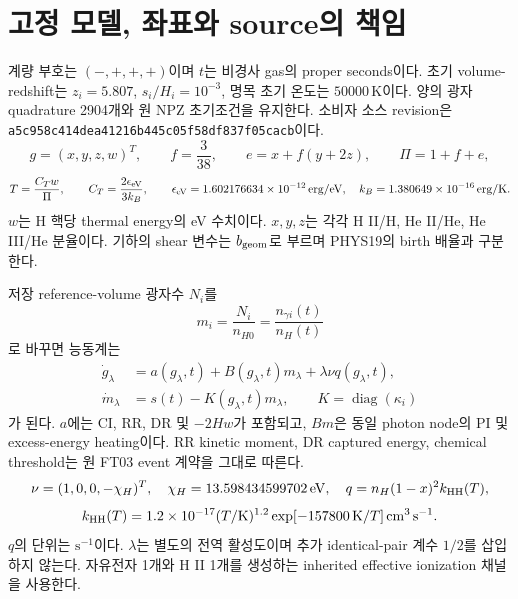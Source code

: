 \documentclass[11pt,a4paper]{article}
\numberwithin{equation}{section}
\begin{document}
\newpage
\section{고정 모델, 좌표와 source의 책임}
계량 부호는 $(-,+,+,+)$이며 $t$는 비경사 gas의 proper seconds이다. 초기 volume-redshift는 $z_i=5.807$, $s_i/H_i=10^{-3}$, 명목 초기 온도는 $50000\,\mathrm K$이다. 양의 광자 quadrature 2904개와 원 NPZ 초기조건을 유지한다. 소비자 소스 revision은 \texttt{a5c958c414dea41216b445c05f58df837f05cacb}이다.
\begin{equation}
 g=(x,y,z,w)^T,\qquad f=\frac3{38},\qquad e=x+f(y+2z),\qquad \Pi=1+f+e,
\end{equation}
\begin{equation}
 T=\frac{C_Tw}{\Pi},\qquad C_T=\frac{2\epsilon_{\mathrm{eV}}}{3k_B},\qquad
 \epsilon_{\mathrm{eV}}=1.602176634\times10^{-12}\,\mathrm{erg/eV},\quad k_B=1.380649\times10^{-16}\,\mathrm{erg/K}.
\end{equation}
$w$는 H 핵당 thermal energy의 eV 수치이다. $x,y,z$는 각각 H II/H, He II/He, He III/He 분율이다. 기하의 shear 변수는 $b_{\rm geom}$로 부르며 PHYS19의 birth 배율과 구분한다.

저장 reference-volume 광자수 $N_i$를
\begin{equation}
 m_i=\frac{N_i}{n_{H0}}=\frac{n_{\gamma i}(t)}{n_H(t)}
\end{equation}
로 바꾸면 능동계는
\begin{align}
 \dot g_\lambda&=a(g_\lambda,t)+B(g_\lambda,t)m_\lambda+\lambda\nu q(g_\lambda,t),\\
 \dot m_\lambda&=s(t)-K(g_\lambda,t)m_\lambda,\qquad K=\operatorname{diag}(\kappa_i)
 \label{eq:system}
\end{align}
가 된다. $a$에는 CI, RR, DR 및 $-2Hw$가 포함되고, $B m$은 동일 photon node의 PI 및 excess-energy heating이다. RR kinetic moment, DR captured energy, chemical threshold는 원 FT03 event 계약을 그대로 따른다.
\begin{equation}
 \nu=(1,0,0,-\chi_H)^T,\quad\chi_H=13.598434599702\,\mathrm{eV},
 \quad q=n_H(1-x)^2k_{\mathrm{HH}}(T),
\end{equation}
\begin{equation}
 k_{\mathrm{HH}}(T)=1.2\times10^{-17}(T/\mathrm K)^{1.2}
 \exp[-157800\,\mathrm K/T]\,\mathrm{cm^3\,s^{-1}}.
\end{equation}
$q$의 단위는 $\mathrm s^{-1}$이다. $\lambda$는 별도의 전역 활성도이며 추가 identical-pair 계수 $1/2$를 삽입하지 않는다. 자유전자 1개와 H II 1개를 생성하는 inherited effective ionization 채널을 사용한다.
\end{document}
